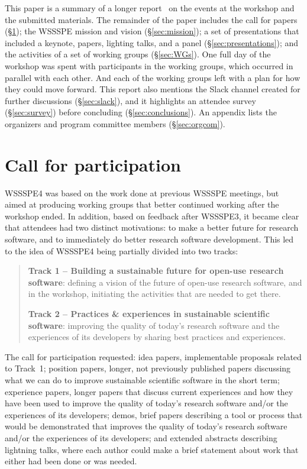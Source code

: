 \documentclass[11pt, oneside]{amsart}
\begin{document}
This paper is a summary of a longer report~\cite{WSSSPE4-report} on the events at the workshop and the submitted materials.
The remainder of the paper includes the call for papers (\S\ref{sec:preworkshop}); the WSSSPE mission and vision (\S\ref{sec:mission}); a set of presentations that included a keynote, papers, lighting talks, and a panel (\S\ref{sec:presentations}); and the activities of a set of working groups (\S\ref{sec:WGs}).  One full day of the
workshop was spent with participants in the working groups, which occurred in parallel
with each other.  And each of the working groups left with a plan for how they could move
forward.
This report also mentions the Slack channel created for further discussions (\S\ref{sec:slack}), and it highlights an attendee survey (\S\ref{sec:survey}) before concluding (\S\ref{sec:conclusions}).
An appendix lists the organizers and program committee members (\S\ref{sec:orgcom}).



\section{Call for participation} \label{sec:preworkshop}

WSSSPE4 was based on the work done at previous WSSSPE meetings, but aimed
at producing working groups that better continued working after the workshop ended.
In addition, based on feedback after WSSSPE3, it became clear that attendees
had two distinct motivations:  to make a better future
for research software, and to immediately do better research software development.
This led to the idea of WSSSPE4 being partially divided into two tracks:

\begin{quote}
    \textbf{Track 1 -- Building a sustainable future for open-use research
    software}: defining a vision of the future of open-use
    research software, and in the workshop, initiating the activities that are
    needed to get there.

    \noindent \textbf{Track 2 -- Practices \& experiences in sustainable scientific software}:
    improving the quality of today's research software and the
    experiences of its developers by sharing best practices and experiences.
\end{quote}

The call for participation requested:
idea papers, implementable proposals related to Track~1;
position papers, longer, not previously published papers
discussing what we can do to improve sustainable scientific
software in the short term;
experience papers, longer papers that discuss current
experiences and how they have been used to improve the quality of
today's research software and/or the experiences of its developers;
demos, brief papers describing a tool or
process that would be demonstrated that improves the quality of today's research
software and\slash or the experiences of its developers; and
extended abstracts describing lightning talks,
where each author could make a brief statement about work that either had been
done or was needed.
\end{document}
